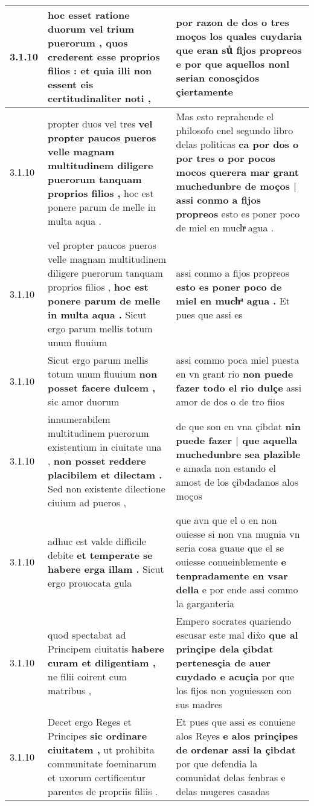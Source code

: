 \begin{tabular}{|p{1cm}|p{6.5cm}|p{6.5cm}|}
3.1.10 & hoc esset ratione duorum vel trium puerorum , \textbf{ quos crederent esse proprios filios : } et quia illi non essent eis certitudinaliter noti , & por razon de dos o tres moços \textbf{ los quales cuydaria que eran suᷤ fijos propreos } e por que aquellos nonl serian conosçidos çiertamente \\\hline
3.1.10 & propter duos vel tres \textbf{ vel propter paucos pueros velle magnam multitudinem diligere puerorum tanquam proprios filios , } hoc est ponere parum de melle in multa aqua . & Mas esto reprahende el philosofo enel segundo libro delas politicas \textbf{ ca por dos o por tres o por pocos mocos querera mar grant muchedunbre de moços | assi conmo a fijos propreos } esto es poner poco de miel en muchͣ agua . \\\hline
3.1.10 & vel propter paucos pueros velle magnam multitudinem diligere puerorum tanquam proprios filios , \textbf{ hoc est ponere parum de melle in multa aqua . } Sicut ergo parum mellis totum unum fluuium & assi conmo a fijos propreos \textbf{ esto es poner poco de miel en muchͣ agua . } Et pues que assi es \\\hline
3.1.10 & Sicut ergo parum mellis totum unum fluuium \textbf{ non posset facere dulcem , } sic amor duorum & assi commo poca miel puesta en vn grant rio \textbf{ non puede fazer todo el rio dulçe } assi amor de dos o de tro fiios \\\hline
3.1.10 & innumerabilem multitudinem puerorum existentium in ciuitate una , \textbf{ non posset reddere placibilem et dilectam . } Sed non existente dilectione ciuium ad pueros , & de que son en vna çibdat \textbf{ nin puede fazer | que aquella muchedunbre sea plazible } e amada non estando el amost de los çibdadanos alos moços \\\hline
3.1.10 & adhuc est valde difficile debite \textbf{ et temperate se habere erga illam . } Sicut ergo prouocata gula & que avn que el o en non ouiesse si non vna mugnia vn seria cosa guaue que el se ouiesse conueinblemente \textbf{ e tenpradamente en vsar della } e por ende assi commo la garganteria \\\hline
3.1.10 & quod spectabat ad Principem ciuitatis \textbf{ habere curam et diligentiam , } ne filii coirent cum matribus , & Empero socrates quariendo escusar este mal dix̉o \textbf{ que al prinçipe dela çibdat pertenesçia de auer cuydado e acuçia } por que los fijos non yoguiessen con sus madres \\\hline
3.1.10 & Decet ergo Reges et Principes \textbf{ sic ordinare ciuitatem , } ut prohibita communitate foeminarum et uxorum certificentur parentes de propriis filiis . & Et pues que assi es conuiene alos Reyes \textbf{ e alos prinçipes de ordenar assi la çibdat } por que defendia la comunidat delas fenbras e delas mugeres casadas \\\hline

\end{tabular}

